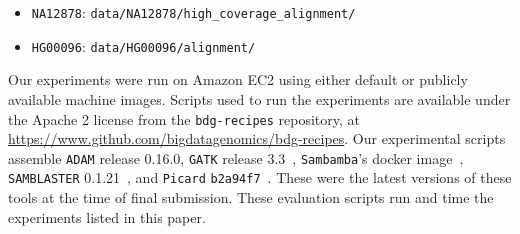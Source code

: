 \documentclass{sig-alternate}
\begin{document}
\begin{itemize}
\item \texttt{NA12878}: \texttt{data/NA12878/high\_coverage\_alignment/}
\item \texttt{HG00096}: \texttt{data/HG00096/alignment/}
\end{itemize}

Our experiments were run on Amazon EC2 using either default or publicly available machine images.
Scripts used to run the experiments are available under the Apache 2 license from the \texttt{bdg-recipes} 
repository, at \url{https://www.github.com/bigdatagenomics/bdg-recipes}. Our experimental scripts
assemble \texttt{ADAM} release 0.16.0, \texttt{GATK} release 3.3~\cite{depristo11}, \texttt{Sambamba}'s docker
image~\cite{tarasov15}, \texttt{SAMBLASTER} 0.1.21~\cite{faust14}, and \texttt{Picard}
\texttt{b2a94f7}~\cite{picard}. These were the latest versions of these tools at the time of final submission. These
evaluation scripts run and time the experiments listed in this paper.

\balance
\end{document}
